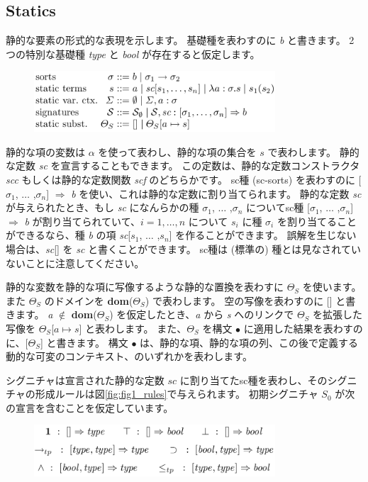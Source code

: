 \documentclass[submit,techreq,noauthor,onecolumn]{ipsj}
\begin{document}
\subsection{Statics}

静的な要素の形式的な表現を示します。
基礎種を表わすのに {\it b} と書きます。
2つの特別な基礎種 {\it type} と {\it bool} が存在すると仮定します。

\begin{figure}[h]
\centering
\includegraphics[width=9cm]{img/infig21_formaldesc.png}
\end{figure}

静的な項の変数は $\alpha$ を使って表わし、静的な項の集合を $s$ で表わします。
静的な定数 {\it sc} を宣言することもできます。
この定数は、静的な定数コンストラクタ {\it scc} もしくは静的な定数関数 {\it scf} のどちらかです。
sc種 (sc-sorts) を表わすのに [$\sigma_1$, $\ldots$ ,$\sigma_n$] $\Rightarrow$ {\it b} を使い、これは静的な定数に割り当てられます。
静的な定数 {\it sc} が与えられたとき、もし {\it sc} になんらかの種 $\sigma_1$, $\ldots$ ,$\sigma_n$ についてsc種 [$\sigma_1$, $\ldots$ ,$\sigma_n$] $\Rightarrow$ {\it b} が割り当てられていて、$i = 1, \ldots ,n$ について $s_i$ に種 $\sigma_i$ を割り当てることができるなら、種 {\it b} の項 {\it sc}[$s_1$, $\ldots$ ,$s_n$] を作ることができます。
誤解を生じない場合は、{\it sc}[] を {\it sc} と書くことができます。
sc種は (標準の) 種とは見なされていないことに注意してください。

静的な変数を静的な項に写像するような静的な置換を表わすに $\Theta_S$ を使います。
また $\Theta_S$ のドメインを {\bf dom}($\Theta_S$) で表わします。
空の写像を表わすのに [] と書きます。
{\it a} $\notin$ {\bf dom}($\Theta_S$) を仮定したとき、{\it a} から {\it s} へのリンクで $\Theta_S$ を拡張した写像を $\Theta_S$[$a \mapsto s$] と表わします。
また、$\Theta_S$ を構文 $\bullet$ に適用した結果を表わすのに、[$\Theta_S$] と書きます。
構文 $\bullet$ は、静的な項、静的な項の列、この後で定義する動的な可変のコンテキスト、のいずれかを表わします。

シグニチャは宣言された静的な定数 $sc$ に割り当てたsc種を表わし、そのシグニチャの形成ルールは図\ref{fig:fig1_rules}で与えられます。
初期シグニチャ $S_0$ が次の宣言を含むことを仮定しています。

\begin{figure}[h]
\centering
\includegraphics[width=9cm]{img/infig21_initialsig.png}
\end{figure}
\end{document}
